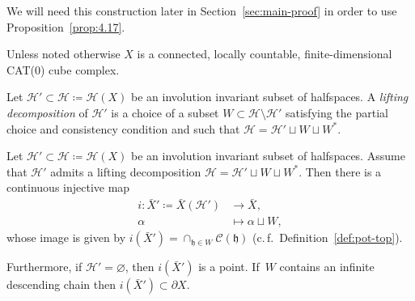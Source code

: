 We will need this construction later in Section~\ref{sec:main-proof} in order to use Proposition~\ref{prop:4.17}.

Unless noted otherwise \(X\) is a connected, locally countable, finite-dimensional CAT(0) cube complex.

\begin{defin}
  Let \(\mathcal{H}' \subset \mathcal{H} \coloneqq \mathcal{H}(X)\) be an involution invariant subset of halfspaces. A \emph{lifting decomposition} of \(\mathcal{H}'\) is a choice of a subset \(W \subset \mathcal{H} \setminus \mathcal{H}'\) satisfying the partial choice and consistency condition and such that \(\mathcal{H} = \mathcal{H}' \sqcup W \sqcup W^\ast\).
\end{defin}

\begin{lemma}[{\cite[Lemma~2.6]{MR3509968}}]
  \label{lem:lifting}
  Let \(\mathcal{H}' \subset \mathcal{H} \coloneqq \mathcal{H}(X)\) be an involution invariant subset of halfspaces. Assume that \(\mathcal{H}'\) admits a lifting decomposition \(\mathcal{H} = \mathcal{H}' \sqcup W \sqcup W^\ast\). Then there is a continuous injective map
  \begin{align*}
    i\colon \bar X' \coloneqq \bar X(\mathcal{H}') & \to \bar X,\\
            \alpha & \mapsto \alpha \sqcup W,
  \end{align*}
  whose image is given by \(i(\bar X') = \cap_{\mathfrak{h} \in W} \mathcal{C}(\mathfrak{h})\) (c.\,f.\ Definition~\ref{def:pot-top}).

  Furthermore, if \(\mathcal{H}' = \varnothing\), then \(i(\bar X')\) is a point. If\ \(W\) contains an infinite descending chain then \(i(\bar X') \subset \partial X\).
\end{lemma}

